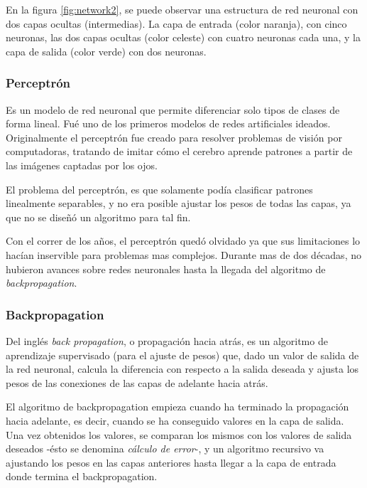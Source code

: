\documentclass[a4paper,12pt,oneside,spanish]{book}
\begin{document}
En la figura \ref{fig:network2}, se puede observar una estructura de red neuronal con dos capas ocultas (intermedias). La capa de entrada (color naranja), con cinco neuronas, las dos capas ocultas (color celeste) con cuatro neuronas cada una, y la capa de salida (color verde) con dos neuronas.\par

\subsubsection{Perceptrón}
Es un modelo de red neuronal que permite diferenciar solo tipos de clases de forma lineal. Fué uno de los primeros modelos de redes artificiales ideados. Originalmente el perceptrón fue creado para resolver problemas de visión por computadoras, tratando de imitar cómo el cerebro aprende patrones a partir de las imágenes captadas por los ojos.\par

El problema del perceptrón, es que solamente podía clasificar patrones linealmente separables, y no era posible ajustar los pesos de todas las capas, ya que no se diseñó un algoritmo para tal fin.\par

Con el correr de los años, el perceptrón quedó olvidado ya que sus limitaciones lo hacían inservible para problemas mas complejos. Durante mas de dos décadas, no hubieron avances sobre redes neuronales hasta la llegada del algoritmo de \textit{backpropagation}.\par

\subsubsection{Backpropagation}
Del inglés \textit{back propagation}, o propagación hacia atrás, es un algoritmo de aprendizaje supervisado (para el ajuste de pesos) que, dado un valor de salida de la red neuronal, calcula la diferencia con respecto a la salida deseada y ajusta los pesos de las conexiones de las capas de adelante hacia atrás.\par

El algoritmo de backpropagation empieza cuando ha terminado la propagación hacia adelante, es decir, cuando se ha conseguido valores en la capa de salida. Una vez obtenidos los valores, se comparan los mismos con los valores de salida deseados -ésto se denomina \textit{cálculo de error}-, y un algoritmo recursivo va ajustando los pesos en las capas anteriores hasta llegar a la capa de entrada donde termina el backpropagation.\par
\end{document}
